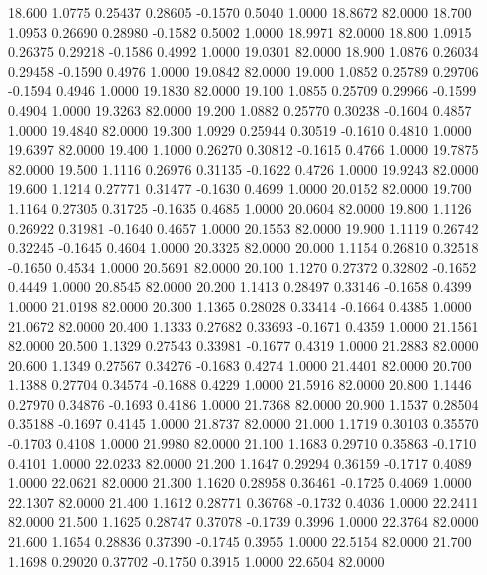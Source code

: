   18.600   1.0775   0.25437   0.28605  -0.1570   0.5040   1.0000  18.8672  82.0000
  18.700   1.0953   0.26690   0.28980  -0.1582   0.5002   1.0000  18.9971  82.0000
  18.800   1.0915   0.26375   0.29218  -0.1586   0.4992   1.0000  19.0301  82.0000
  18.900   1.0876   0.26034   0.29458  -0.1590   0.4976   1.0000  19.0842  82.0000
  19.000   1.0852   0.25789   0.29706  -0.1594   0.4946   1.0000  19.1830  82.0000
  19.100   1.0855   0.25709   0.29966  -0.1599   0.4904   1.0000  19.3263  82.0000
  19.200   1.0882   0.25770   0.30238  -0.1604   0.4857   1.0000  19.4840  82.0000
  19.300   1.0929   0.25944   0.30519  -0.1610   0.4810   1.0000  19.6397  82.0000
  19.400   1.1000   0.26270   0.30812  -0.1615   0.4766   1.0000  19.7875  82.0000
  19.500   1.1116   0.26976   0.31135  -0.1622   0.4726   1.0000  19.9243  82.0000
  19.600   1.1214   0.27771   0.31477  -0.1630   0.4699   1.0000  20.0152  82.0000
  19.700   1.1164   0.27305   0.31725  -0.1635   0.4685   1.0000  20.0604  82.0000
  19.800   1.1126   0.26922   0.31981  -0.1640   0.4657   1.0000  20.1553  82.0000
  19.900   1.1119   0.26742   0.32245  -0.1645   0.4604   1.0000  20.3325  82.0000
  20.000   1.1154   0.26810   0.32518  -0.1650   0.4534   1.0000  20.5691  82.0000
  20.100   1.1270   0.27372   0.32802  -0.1652   0.4449   1.0000  20.8545  82.0000
  20.200   1.1413   0.28497   0.33146  -0.1658   0.4399   1.0000  21.0198  82.0000
  20.300   1.1365   0.28028   0.33414  -0.1664   0.4385   1.0000  21.0672  82.0000
  20.400   1.1333   0.27682   0.33693  -0.1671   0.4359   1.0000  21.1561  82.0000
  20.500   1.1329   0.27543   0.33981  -0.1677   0.4319   1.0000  21.2883  82.0000
  20.600   1.1349   0.27567   0.34276  -0.1683   0.4274   1.0000  21.4401  82.0000
  20.700   1.1388   0.27704   0.34574  -0.1688   0.4229   1.0000  21.5916  82.0000
  20.800   1.1446   0.27970   0.34876  -0.1693   0.4186   1.0000  21.7368  82.0000
  20.900   1.1537   0.28504   0.35188  -0.1697   0.4145   1.0000  21.8737  82.0000
  21.000   1.1719   0.30103   0.35570  -0.1703   0.4108   1.0000  21.9980  82.0000
  21.100   1.1683   0.29710   0.35863  -0.1710   0.4101   1.0000  22.0233  82.0000
  21.200   1.1647   0.29294   0.36159  -0.1717   0.4089   1.0000  22.0621  82.0000
  21.300   1.1620   0.28958   0.36461  -0.1725   0.4069   1.0000  22.1307  82.0000
  21.400   1.1612   0.28771   0.36768  -0.1732   0.4036   1.0000  22.2411  82.0000
  21.500   1.1625   0.28747   0.37078  -0.1739   0.3996   1.0000  22.3764  82.0000
  21.600   1.1654   0.28836   0.37390  -0.1745   0.3955   1.0000  22.5154  82.0000
  21.700   1.1698   0.29020   0.37702  -0.1750   0.3915   1.0000  22.6504  82.0000
